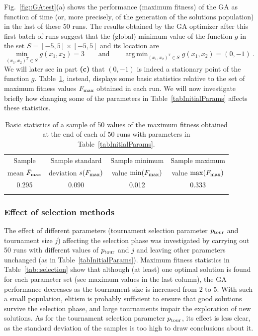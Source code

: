 \documentclass[12pt,titlepage]{article}
\DeclareMathOperator*{\argmin}{arg\,min}
\begin{document}
Fig.~\ref{fig::GAtest}(a) shows the performance (maximum fitness) of the GA as function of time (or, more precisely, of the generation of the solutions population) in the last of these 50 runs. The results obtained by the GA optimizer after this first batch of runs suggest that the (global) minimum value of the function $g$ in the set $S = [-5,5] \times [-5,5]$ and its location are
\[
\min_{(x_1, x_2)^T \in S} g(x_1, x_2) = 3 \qquad \text{and} \qquad \argmin_{(x_1, x_2)^T \in S} g(x_1, x_2) = (0, -1) \ .
\]
We will later see in part \textbf{(c)} that $(0, -1)$ is indeed a stationary point of the function $g$. Table~\ref{tab::basicstats}, instead, displays some basic statistics relative to the set of maximum fitness values $F_{\textup{max}}$ obtained in each run. We will now investigate briefly how changing some of the parameters in Table~\ref{tabInitialParams} affects these statistics.

\begin{table}[H]
\centering
\begin{tabular}{cccc}
\toprule
Sample  & Sample standard & Sample minimum  & Sample maximum \\
mean $\bar{F}_{\textup{max}}$ & deviation $s(F_{\textup{max}})$ & value $\min(F_{\textup{max}})$ & value $\max(F_{\textup{max}})$\\
\midrule
0.295 & 0.090 & 0.012 & 0.333 \\
\bottomrule
\caption{Basic statistics of a sample of 50 values of the maximum fitness obtained at the end of each of 50 runs with parameters in Table~\ref{tabInitialParams}.}
\label{tab::basicstats}
\end{tabular}
\end{table}

\subsubsection*{Effect of selection methods}
The effect of different parameters (tournament selection parameter $p_{\textup{tour}}$ and tournament size $j$) affecting the selection phase was investigated by carrying out 50 runs with different values of $p_{\textup{tour}}$ and $j$ and leaving other parameters unchanged (as in Table~\ref{tabInitialParams}). Maximum fitness statistics in Table~\ref{tab::selection} show that although (at least) one optimal solution is found for each parameter set (see maximum values in the last column), the GA performance decreases as the tournament size is increased from 2 to 5. With such a small population, elitism is probably sufficient to ensure that good solutions survive the selection phase, and large tournaments impair the exploration of new solutions. As for the tournament selection parameter $p_{\textup{tour}}$, its effect is less clear, as the standard deviation of the samples is too high to draw conclusions about it.
\end{document}
